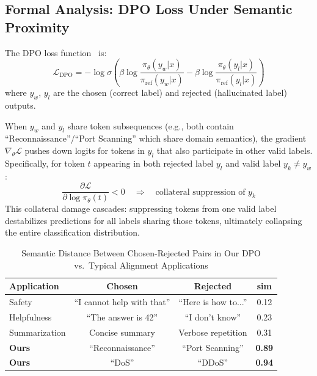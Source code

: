 \documentclass[journal]{IEEEtran}
\begin{document}
\subsection{Formal Analysis: DPO Loss Under Semantic Proximity}
The DPO loss function~\cite{rafailov2023} is:
\begin{equation}
\mathcal{L}_\text{DPO} = -\log \sigma\left(\beta \log \frac{\pi_\theta(y_w|x)}{\pi_\text{ref}(y_w|x)} - \beta \log \frac{\pi_\theta(y_l|x)}{\pi_\text{ref}(y_l|x)}\right)
\end{equation}
where $y_w$, $y_l$ are the chosen (correct label) and rejected (hallucinated label) outputs.

When $y_w$ and $y_l$ share token subsequences (e.g., both contain ``Reconnaissance''/``Port Scanning'' which share domain semantics), the gradient $\nabla_\theta \mathcal{L}$ pushes down logits for tokens in $y_l$ that also participate in other valid labels. Specifically, for token $t$ appearing in both rejected label $y_l$ and valid label $y_k \neq y_w$:
\begin{equation}
\frac{\partial \mathcal{L}}{\partial \log \pi_\theta(t)} < 0 \quad \Rightarrow \quad \text{collateral suppression of } y_k
\end{equation}
This collateral damage cascades: suppressing tokens from one valid label destabilizes predictions for all labels sharing those tokens, ultimately collapsing the entire classification distribution.

\begin{table}[!ht]
\centering\caption{Semantic Distance Between Chosen-Rejected Pairs in Our DPO vs.\ Typical Alignment Applications}
\label{tab:semdist}
\begin{tabular}{lccc}
\toprule
\textbf{Application} & \textbf{Chosen} & \textbf{Rejected} & \textbf{sim} \\
\midrule
Safety & ``I cannot help with that'' & ``Here is how to...'' & 0.12 \\
Helpfulness & ``The answer is 42'' & ``I don't know'' & 0.23 \\
Summarization & Concise summary & Verbose repetition & 0.31 \\
\midrule
\textbf{Ours} & ``Reconnaissance'' & ``Port Scanning'' & \textbf{0.89} \\
\textbf{Ours} & ``DoS'' & ``DDoS'' & \textbf{0.94} \\
\bottomrule
\end{tabular}
\end{table}
\end{document}
